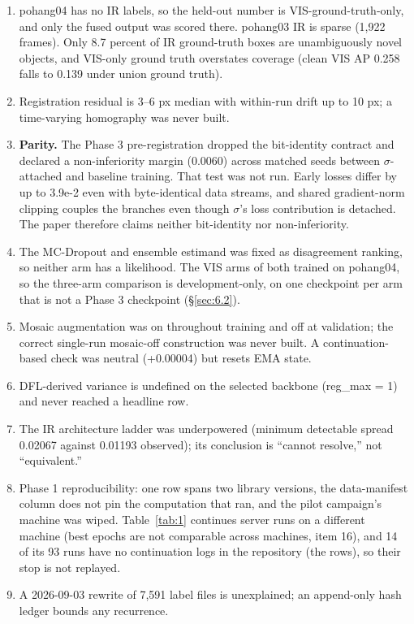 \documentclass[10pt]{article}
\begin{document}
\begin{enumerate}
\item pohang04 has no IR labels, so the held-out number is VIS-ground-truth-only, and only the fused output was scored there. pohang03 IR is sparse (1,922 frames). Only 8.7 percent of IR ground-truth boxes are unambiguously novel objects, and VIS-only ground truth overstates coverage (clean VIS AP 0.258 falls to 0.139 under union ground truth).
\item Registration residual is 3--6 px median with within-run drift up to 10 px; a time-varying homography was never built.
\item \textbf{Parity.} The Phase 3 pre-registration dropped the bit-identity contract and declared a non-inferiority margin (0.0060) across matched seeds between $\sigma$-attached and baseline training. That test was not run. Early losses differ by up to 3.9e-2 even with byte-identical data streams, and shared gradient-norm clipping couples the branches even though $\sigma$'s loss contribution is detached. The paper therefore claims neither bit-identity nor non-inferiority.
\item The MC-Dropout and ensemble estimand was fixed as disagreement ranking, so neither arm has a likelihood. The VIS arms of both trained on pohang04, so the three-arm comparison is development-only, on one checkpoint per arm that is not a Phase 3 checkpoint (\S\ref{sec:6.2}).
\item Mosaic augmentation was on throughout training and off at validation; the correct single-run mosaic-off construction was never built. A continuation-based check was neutral (+0.00004) but resets EMA state.
\item DFL-derived variance is undefined on the selected backbone (reg\_max = 1) and never reached a headline row.
\item The IR architecture ladder was underpowered (minimum detectable spread 0.02067 against 0.01193 observed); its conclusion is ``cannot resolve,'' not ``equivalent.''
\item Phase 1 reproducibility: one row spans two library versions, the data-manifest column does not pin the computation that ran, and the pilot campaign's machine was wiped. Table~\ref{tab:1} continues server runs on a different machine (best epochs are not comparable across machines, item 16), and 14 of its 93 runs have no continuation logs in the repository (the \textdagger{} rows), so their stop is not replayed.
\item A 2026-09-03 rewrite of 7,591 label files is unexplained; an append-only hash ledger bounds any recurrence.

\end{enumerate}
\end{document}
